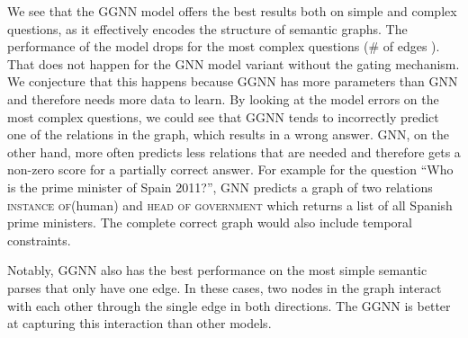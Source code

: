 \documentclass[11pt]{article}
\begin{document}
We see that the GGNN model offers the best results both on simple and complex questions, as it effectively encodes the structure of semantic graphs. The performance of the model drops for the most complex questions (\# of edges ). That does not happen for the GNN model variant without the gating mechanism. We conjecture that this happens because GGNN has more parameters than GNN and therefore needs more data to learn. By looking at the model errors on the most complex questions, we could see that GGNN tends to incorrectly predict one of the relations in the graph, which results in a wrong answer. GNN, on the other hand, more often predicts less relations that are needed and therefore gets a non-zero score for a partially correct answer. For example for the question ``Who is the prime minister of Spain 2011?'', GNN predicts a graph of two relations \textsc{instance of}\hspace{0.1em}({\small\sffamily human}) and \textsc{head of government} which returns a list of all Spanish prime ministers. The complete correct graph would also include temporal constraints.


Notably, GGNN also has the best performance on the most simple semantic parses that only have one edge. In these cases, two nodes in the graph interact with each other through the single edge in both directions. The GGNN is better at capturing this interaction than other models.
\end{document}
